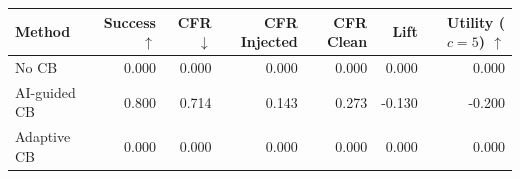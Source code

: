 \begin{tabular}{lrrrrrr}
\toprule
Method & Success $\uparrow$ & CFR $\downarrow$ & CFR Injected & CFR Clean & Lift & Utility ($c=5$) $\uparrow$ \\
\midrule
No CB & 0.000 & 0.000 & 0.000 & 0.000 & 0.000 & 0.000 \\
AI-guided CB & 0.800 & 0.714 & 0.143 & 0.273 & -0.130 & -0.200 \\
Adaptive CB & 0.000 & 0.000 & 0.000 & 0.000 & 0.000 & 0.000 \\
\bottomrule
\end{tabular}
